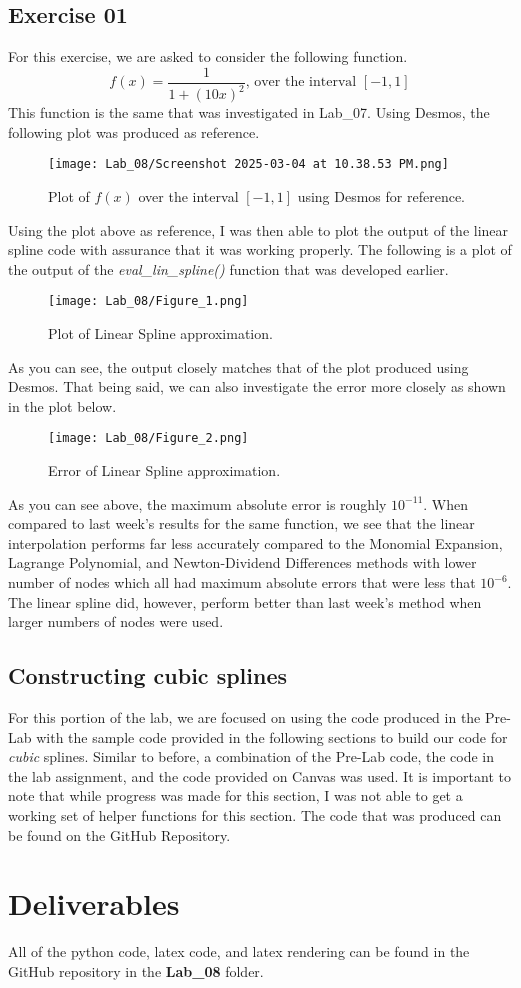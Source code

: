\documentclass{article}
\begin{document}
\subsection{Exercise 01}
For this exercise, we are asked to consider the following function.
\[
f(x) = \frac{1}{1+(10x)^2}\mbox{, over the interval } [-1,1]
\]
This function is the same that was investigated in Lab\_07. Using Desmos, the following plot was produced as reference.
\newpage
\begin{figure}[h!]
    \centering
    \texttt{[image: Lab\_08/Screenshot 2025-03-04 at 10.38.53 PM.png]}
    \caption{Plot of \(f(x)\) over the interval \([-1,1]\) using Desmos for reference.}
    \label{fig:enter-label}
\end{figure}
Using the plot above as reference, I was then able to plot the output of the linear spline code with assurance that it was working properly. The following is a plot of the output of the \textit{eval\_lin\_spline()} function that was developed earlier.
\begin{figure}[h!]
    \centering
    \texttt{[image: Lab\_08/Figure\_1.png]}
    \caption{Plot of Linear Spline approximation.}
    \label{fig:enter-label}
\end{figure}
\newpage
As you can see, the output closely matches that of the plot produced using Desmos. That being said, we can also investigate the error more closely as shown in the plot below.
\begin{figure}[h!]
    \centering
    \texttt{[image: Lab\_08/Figure\_2.png]}
    \caption{Error of Linear Spline approximation.}
    \label{fig:enter-label}
\end{figure}
As you can see above, the maximum absolute error is roughly \(10^{-11}\). When compared to last week's results for the same function, we see that the linear interpolation performs far less accurately compared to the Monomial Expansion, Lagrange Polynomial, and Newton-Dividend Differences methods with lower number of nodes which all had maximum absolute errors that were less that \(10^{-6}\). The linear spline did, however, perform better than last week's method when larger numbers of nodes were used.

\subsection{Constructing cubic splines}
For this portion of the lab, we are focused on using the code produced in the Pre-Lab with the sample code provided in the following sections to build our code for \textit{cubic} splines. Similar to before, a combination of the Pre-Lab code, the code in the lab assignment, and the code provided on Canvas was used. It is important to note that while progress was made for this section, I was not able to get a working set of helper functions for this section. The code that was produced can be found on the GitHub Repository.

\section{Deliverables}
All of the python code, latex code, and latex rendering can be found in the GitHub repository in the \textbf{Lab\_08} folder.
\end{document}
